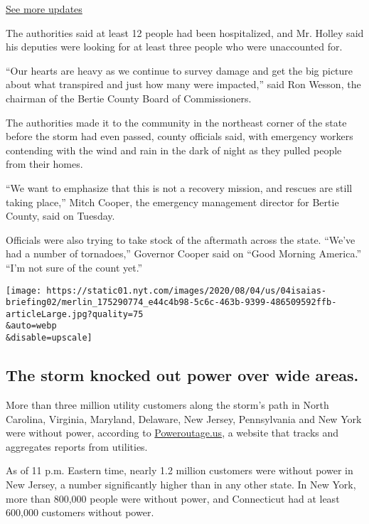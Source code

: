 \href{https://www.nytimes.com/2020/08/04/us/isaias-storm-updates.html?action=click\&pgtype=Article\&state=default\&region=MAIN_CONTENT_1\&context=storylines_live_updates}{See
more updates}

The authorities said at least 12 people had been hospitalized, and Mr.
Holley said his deputies were looking for at least three people who were
unaccounted for.

``Our hearts are heavy as we continue to survey damage and get the big
picture about what transpired and just how many were impacted,'' said
Ron Wesson, the chairman of the Bertie County Board of Commissioners.

The authorities made it to the community in the northeast corner of the
state before the storm had even passed, county officials said, with
emergency workers contending with the wind and rain in the dark of night
as they pulled people from their homes.

``We want to emphasize that this is not a recovery mission, and rescues
are still taking place,'' Mitch Cooper, the emergency management
director for Bertie County, said on Tuesday.

Officials were also trying to take stock of the aftermath across the
state. ``We've had a number of tornadoes,'' Governor Cooper said on
``Good Morning America.'' ``I'm not sure of the count yet.''

\texttt{[image: https://static01.nyt.com/images/2020/08/04/us/04isaias-briefing02/merlin\_175290774\_e44c4b98-5c6c-463b-9399-486509592ffb-articleLarge.jpg?quality=75\\\&auto=webp\\\&disable=upscale]}

\hypertarget{the-storm-knocked-out-power-over-wide-areas}{%
\subsection{The storm knocked out power over wide
areas.}\label{the-storm-knocked-out-power-over-wide-areas}}

More than three million utility customers along the storm's path in
North Carolina, Virginia, Maryland, Delaware, New Jersey, Pennsylvania
and New York were without power, according to
\href{https://poweroutage.us/}{Poweroutage.us}, a website that tracks
and aggregates reports from utilities.

As of 11 p.m. Eastern time, nearly 1.2 million customers were without
power in New Jersey, a number significantly higher than in any other
state. In New York, more than 800,000 people were without power, and
Connecticut had at least 600,000 customers without power.

